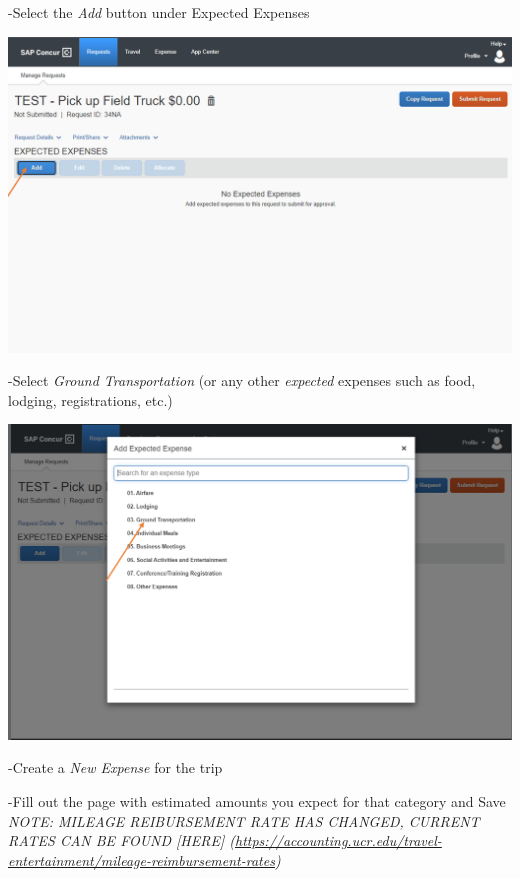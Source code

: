 \documentclass[
]{book}
\begin{document}
-Select the \emph{Add} button under Expected Expenses

\begin{flushleft}\includegraphics{images/concur3} \end{flushleft}

-Select \emph{Ground Transportation} (or any other \emph{expected} expenses such as food, lodging, registrations, etc.)

\begin{flushleft}\includegraphics{images/concur4} \end{flushleft}

-Create a \emph{New Expense} for the trip

-Fill out the page with estimated amounts you expect for that category and Save
\emph{NOTE: MILEAGE REIBURSEMENT RATE HAS CHANGED, CURRENT RATES CAN BE FOUND {[}HERE{]} (\url{https://accounting.ucr.edu/travel-entertainment/mileage-reimbursement-rates})}
\end{document}
